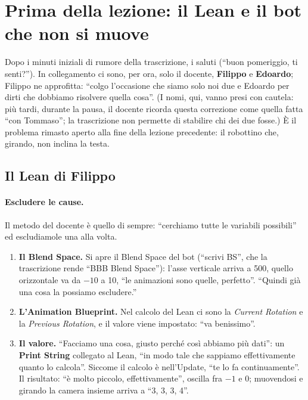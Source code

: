 \section{Prima della lezione: il Lean e il bot che non si muove}
\label{ue11:sec:inizio}

Dopo i minuti iniziali di rumore della trascrizione, i saluti (``buon pomeriggio, ti
senti?''). In collegamento ci sono, per ora, solo il docente, \textbf{Filippo} e
\textbf{Edoardo}; Filippo ne approfitta: ``colgo l'occasione che siamo solo noi due e
Edoardo per dirti che dobbiamo risolvere quella cosa''. (I nomi, qui, vanno presi con
cautela: più tardi, durante la pausa, il docente ricorda questa correzione come quella
fatta ``con Tommaso''; la trascrizione non permette di stabilire chi dei due fosse.) È il problema rimasto aperto alla
fine della lezione precedente: il robottino che, girando, non inclina la testa.

\subsection{Il Lean di Filippo}

\paragraph{Escludere le cause.} Il metodo del docente è quello di sempre: ``cerchiamo
tutte le variabili possibili'' ed escludiamole una alla volta.
\begin{enumerate}
  \item \textbf{Il Blend Space.} Si apre il Blend Space del bot (``scrivi BS'', che la
        trascrizione rende ``BBB Blend Space''): l'asse verticale arriva a 500, quello
        orizzontale va da $-10$ a 10, ``le animazioni sono quelle, perfetto''. ``Quindi già
        una cosa la possiamo escludere.''
  \item \textbf{L'Animation Blueprint.} Nel calcolo del Lean ci sono la \emph{Current
        Rotation} e la \emph{Previous Rotation}, e il valore viene impostato: ``va
        benissimo''.
  \item \textbf{Il valore.} ``Facciamo una cosa, giusto perché così abbiamo più dati'':
        un \textbf{Print String} collegato al Lean, ``in modo tale che sappiamo
        effettivamente quanto lo calcola''. Siccome il calcolo è nell'Update, ``te lo fa
        continuamente''. Il risultato: ``è molto piccolo, effettivamente'', oscilla fra
        $-1$ e 0; muovendosi e girando la camera insieme arriva a ``3, 3, 3, 4''.
\end{enumerate}

